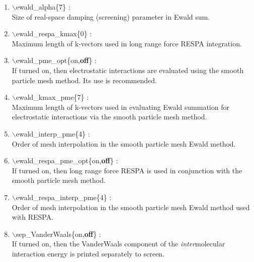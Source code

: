 \documentclass[12pt]{article}
\begin{document}
\begin{itemize}
\begin{enumerate}
 \vspace{0.15in} \Large
 \item   $\backslash$ewald\_alpha\{7\} : \\
  \large
  Size of real-space damping (screening) parameter in Ewald sum.

 \vspace{0.15in} \Large
 \item   $\backslash$ewald\_respa\_kmax\{0\} : \\
  \large
   Maximum length of k-vectors used in long range force RESPA integration.

 \vspace{0.15in}\Large
 \item   $\backslash$ewald\_pme\_opt\{on,{\bf off}\} : \\
  \large
  If turned on, then electrostatic interactions are evaluated using the
  smooth particle mesh method.  Its use is recommended.

 \vspace{0.15in} \Large
 \item   $\backslash$ewald\_kmax\_pme\{7\} : \\
  \large
  Maximum length of k-vectors used in evaluating Ewald summation for 
  electrostatic interactions via the smooth particle mesh method.

 \vspace{0.15in} \Large
 \item   $\backslash$ewald\_interp\_pme\{4\} : \\
   \large
   Order of mesh interpolation in the smooth particle mesh Ewald method.

 \vspace{0.15in} \Large
 \item   $\backslash$ewald\_respa\_pme\_opt\{on,{\bf off}\} : \\
  \large
  If turned on, then long range force RESPA is used in conjunction with the
  smooth particle mesh method.

 \vspace{0.15in} \Large
 \item   $\backslash$ewald\_respa\_interp\_pme\{4\} : \\
  \large
  Order of mesh interpolation in the smooth particle mesh Ewald method used
  with RESPA.

 \vspace{0.15in}\Large
 \item   $\backslash$sep\_VanderWaals\{on,{\bf off}\} : \\
   \large
   If turned on, then the VanderWaals component of the {\it inter}molecular 
   interaction energy is printed separately to screen.


\end{enumerate}
\end{itemize}
\end{document}
